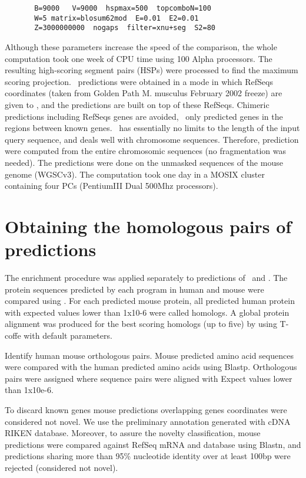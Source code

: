 \begin{verbatim}
       B=9000   V=9000  hspmax=500  topcomboN=100 
       W=5 matrix=blosum62mod  E=0.01  E2=0.01  
       Z=3000000000  nogaps  filter=xnu+seg  S2=80
\end{verbatim}


Although these parameters increase the speed of the comparison, the
whole computation took one week of CPU time using 100 Alpha
processors. The resulting high-scoring segment pairs (HSPs) were
processed to find the maximum scoring projection.  \sgp\ predictions
were obtained in a mode in which RefSeqs coordinates (taken from
Golden Path M. musculus February 2002 freeze) are given to \sgp, and
the predictions are built on top of these RefSeqs. Chimeric
predictions including RefSeqs genes are avoided, \sgp\ only predicted
genes in the regions between known genes.  \geneid\ has essentially no
limits to the length of the input query sequence, and deals well with
chromosome sequences. Therefore, prediction were computed from the
entire chromosomic sequences (no fragmentation was needed). The
predictions were done on the unmasked sequences of the mouse genome
(WGSCv3). The computation took one day in a MOSIX cluster containing
four PCs (PentiumIII Dual 500Mhz processors).



\section{Obtaining the homologous pairs of predictions}

The enrichment procedure was applied separately to predictions of
\twinscan\ and \sgp. The protein sequences predicted by each program in
human and mouse were compared using \blp. For each predicted mouse
protein, all predicted human protein with expected values lower than
1x10-6 were called homologs. A global protein alignment was produced
for the best scoring homologs (up to five) by using T-coffe with
default parameters.

Identify human mouse orthologous pairs.
Mouse predicted amino acid sequences were compared with the human
predicted amino acids using Blastp. Orthologous pairs were assigned
where sequence pairs were aligned with Expect values lower than
1x10e-6.

To discard known genes mouse predictions overlapping \ensembl genes
coordinates were considered not novel. We use the preliminary \ensembl
annotation generated with cDNA RIKEN database. Moreover, to assure the
novelty classification, mouse predictions were compared against RefSeq
mRNA and \ensembl database using Blastn, and predictions sharing more
than 95\% nucleotide identity over at least 100bp were rejected
(considered not novel).


